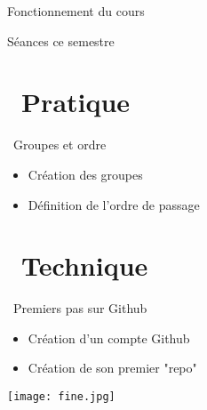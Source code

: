 \documentclass[10pt]{beamer}
\begin{document}
\begin{frame}{Fonctionnement du cours}
\begin{block}{Séances ce semestre}
\end{block}
\end{frame}


\section{\faFlask~Pratique}
\begin{frame}{\faFlask~Groupes et ordre}
        \begin{itemize}
            \item Création des groupes
            \item Définition de l'ordre de passage
        \end{itemize}
\end{frame}

\section{\faLaptopCode~Technique}

\begin{frame}{\faLaptopCode~Premiers pas sur Github}
        \begin{itemize}
            \item Création d'un compte Github \faGithubSquare
            \item Création de son premier "repo"
        \end{itemize}
\end{frame}

\begin{frame}[plain]
    \begin{center}
        \texttt{[image: fine.jpg]}
    \end{center}
\end{frame}
\end{document}
